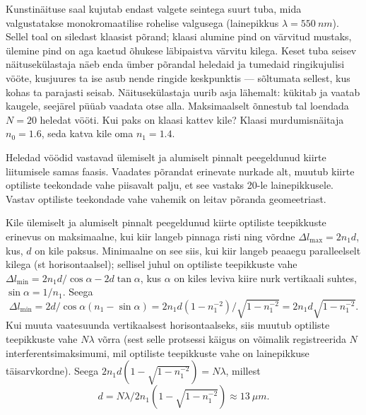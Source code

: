 
Kunstinäituse saal kujutab endast valgete seintega suurt tuba, mida valgustatakse monokromaatilise rohelise valgusega (lainepikkus $\lambda=\SI{550}{nm}$).
Sellel toal on siledast klaasist põrand; klaasi
alumine pind on värvitud mustaks, ülemine pind on aga kaetud õhukese läbipaistva värvitu kilega.
Keset tuba seisev näitusekülastaja
näeb enda ümber põrandal heledaid ja tumedaid ringikujulisi vööte, kusjuures ta ise asub nende ringide keskpunktis --- sõltumata sellest, kus kohas ta parajasti seisab. Näitusekülastaja uurib asja lähemalt: kükitab ja vaatab kaugele, seejärel püüab vaadata otse alla. Maksimaalselt õnnestub tal loendada $N=\num{20}$ heledat vööti. Kui paks on klaasi kattev kile?
Klaasi murdumisnäitaja $n_0=\num{1.6}$, seda katva kile oma $n_1=\num{1.4}$.

\hint
Heledad vöödid vastavad ülemiselt ja alumiselt pinnalt peegeldunud kiirte liitumisele samas faasis. Vaadates põrandat erinevate nurkade alt, muutub kiirte optiliste teekondade vahe piisavalt palju, et see vastaks \num{20}-le lainepikkusele. Vastav optiliste teekondade vahe vahemik on leitav põranda geomeetriast.

\solu
Kile ülemiselt ja alumiselt pinnalt peegeldunud kiirte optiliste teepikkuste erinevus on maksimaalne, kui
kiir langeb pinnaga risti ning võrdne $\Delta l_{\max}=2n_1d$, kus, $d$ on kile paksus. Minimaalne on see siis, kui kiir langeb peaaegu paralleelselt kilega (st horisontaalsel); sellisel juhul on optiliste teepikkuste vahe $\Delta l_{\min}=2n_1d/\cos\alpha-2d\tan\alpha$, kus $\alpha$ on kiles leviva kiire nurk vertikaali suhtes, $\sin\alpha=1/n_1$. Seega 
\[
\Delta l_{\min}=2d/\cos\alpha(n_1-\sin\alpha)=2n_1d(1-n_1^{-2})/\sqrt{1-n_1^{-2}}=2n_1d\sqrt{1-n_1^{-2}}.
\]
Kui muuta vaatesuunda vertikaalsest horisontaalseks, siis muutub optiliste teepikkuste vahe $N\lambda$ võrra (sest selle protsessi käigus on võimalik registreerida $N$ interferentsimaksimumi, mil optiliste teepikkuste vahe on lainepikkuse täisarvkordne). Seega
$2n_1d(1-\sqrt{1-n_1^{-2}})=N\lambda$, millest $$d=N\lambda/2n_1(1-\sqrt{1-n_1^{-2}})\approx \SI{13}{\mu m}.$$
\probend